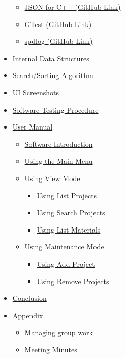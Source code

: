 \documentclass[
  english,
  a4paper,
,tablecaptionabove
]{scrartcl}
\providecommand{\tightlist}{%
  \setlength{\itemsep}{0pt}\setlength{\parskip}{0pt}}
\begin{document}
\begin{itemize}
  \begin{itemize}
  \tightlist
  \item
    \protect\hyperlink{json-for-c-github-link}{JSON for C++ (GitHub
    Link)}
  \item
    \protect\hyperlink{gtest-github-link}{GTest (GitHub Link)}
  \item
    \protect\hyperlink{spdlog-github-link}{spdlog (GitHub Link)}
  \end{itemize}
\item
  \protect\hyperlink{internal-data-structures}{Internal Data Structures}
\item
  \protect\hyperlink{searchsorting-algorithm}{Search/Sorting Algorithm}
\item
  \protect\hyperlink{ui-screenshots}{UI Screenshots}
\item
  \protect\hyperlink{software-testing-procedure}{Software Testing
  Procedure}
\item
  \protect\hyperlink{user-manual}{User Manual}

  \begin{itemize}
  \tightlist
  \item
    \protect\hyperlink{software-introduction}{Software Introduction}
  \item
    \protect\hyperlink{using-the-main-menu}{Using the Main Menu}
  \item
    \protect\hyperlink{using-view-mode}{Using View Mode}

    \begin{itemize}
    \tightlist
    \item
      \protect\hyperlink{using-list-projects}{Using List Projects}
    \item
      \protect\hyperlink{using-search-projects}{Using Search Projects}
    \item
      \protect\hyperlink{using-list-materials}{Using List Materials}
    \end{itemize}
  \item
    \protect\hyperlink{using-maintenance-mode}{Using Maintenance Mode}

    \begin{itemize}
    \tightlist
    \item
      \protect\hyperlink{using-add-project}{Using Add Project}
    \item
      \protect\hyperlink{using-remove-projects}{Using Remove Projects}
    \end{itemize}
  \end{itemize}
\item
  \protect\hyperlink{conclusion}{Conclusion}
\item
  \protect\hyperlink{appendix}{Appendix}

  \begin{itemize}
  \tightlist
  \item
    \protect\hyperlink{managing-group-work}{Managing group work}
  \item
    \protect\hyperlink{meeting-minutes}{Meeting Minutes}
  \end{itemize}
\end{itemize}
\end{document}
